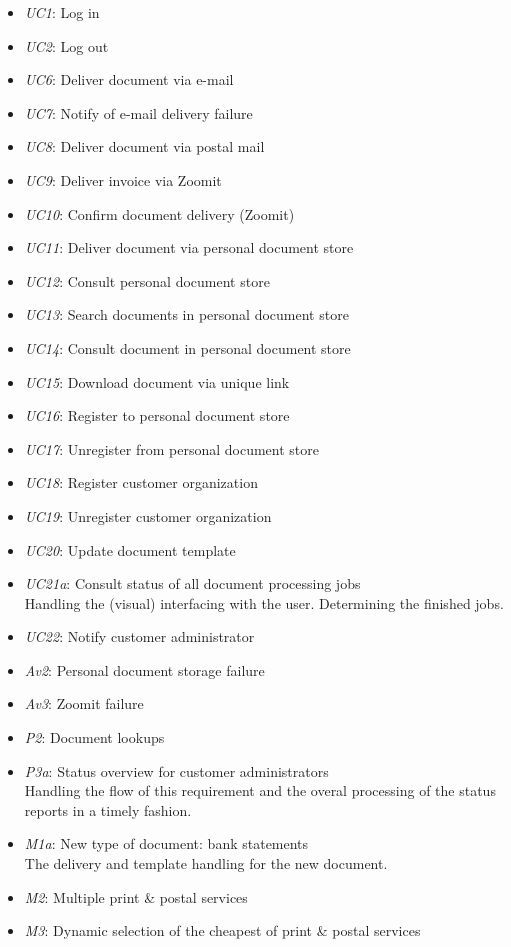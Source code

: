\documentclass[a4paper,10pt]{article}
\begin{document}
\begin{itemize}
    \item \emph{UC1}: Log in
    \item \emph{UC2}: Log out
    \item \emph{UC6}: Deliver document via e-mail
    \item \emph{UC7}: Notify of e-mail delivery failure
    \item \emph{UC8}: Deliver document via postal mail
    \item \emph{UC9}: Deliver invoice via Zoomit
    \item \emph{UC10}: Confirm document delivery (Zoomit)
    \item \emph{UC11}: Deliver document via personal document store
    \item \emph{UC12}: Consult personal document store
    \item \emph{UC13}: Search documents in personal document store
    \item \emph{UC14}: Consult document in personal document store
    \item \emph{UC15}: Download document via unique link
    \item \emph{UC16}: Register to personal document store
    \item \emph{UC17}: Unregister from personal document store
    \item \emph{UC18}: Register customer organization
    \item \emph{UC19}: Unregister customer organization
    \item \emph{UC20}: Update document template
    \item \emph{UC21a}: Consult status of all document processing jobs\\
    Handling the (visual) interfacing with the user. Determining the finished jobs.
    \item \emph{UC22}: Notify customer administrator
    \item \emph{Av2}: Personal document storage failure 
    \item \emph{Av3}: Zoomit failure
    \item \emph{P2}: Document lookups
    \item \emph{P3a}: Status overview for customer administrators\\
    Handling the flow of this requirement and the overal processing of the status reports in a timely fashion.
    \item \emph{M1a}: New type of document: bank statements\\
    The delivery and template handling for the new document.
    \item \emph{M2}: Multiple print \& postal services
    \item \emph{M3}: Dynamic selection of the cheapest of print \& postal services
\end{itemize}
\end{document}
